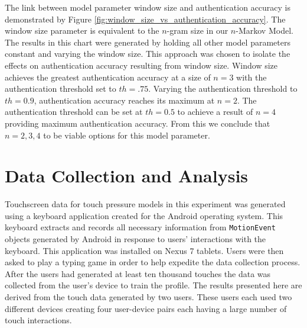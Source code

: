\documentclass{acm_proc_article-sp}
\begin{document}
The link between model parameter window size and authentication accuracy is demonstrated by Figure \ref{fig:window_size_vs_authentication_accuracy}.
The window size parameter is equivalent to the $n$-gram size in our $n$-Markov Model.
The results in this chart were generated by 
holding all other model parameters constant and varying the window size. 
This approach was chosen to isolate the effects on 
authentication accuracy resulting from window size.
Window size achieves the greatest authentication accuracy at a size of $n=3$ with the authentication threshold set to $th=.75$.
Varying the authentication threshold to $th=0.9$, authentication accuracy reaches its maximum at $n=2$. 
The authentication threshold can be set at $th=0.5$ to achieve a result of $n=4$ providing maximum authentication accuracy.
From this we conclude that $n={2,3,4}$ to be viable options for this model parameter.


\section{Data Collection and Analysis}
\label{sec:data_collection}
Touchscreen data for touch pressure models in this experiment 
was generated using a keyboard application created for the Android operating system. 
This keyboard extracts and records all necessary information 
from {\tt MotionEvent} objects generated by Android in response to
users' interactions with the keyboard.
This application was installed on Nexus 7 tablets.
Users were then asked to play a typing game 
in order to help expedite the data collection process.
After the users had generated at least ten thousand touches the data was collected from the user's device to train the profile.
%
The results presented here are derived from the touch data generated by two users.
These users each used two different devices creating four user-device pairs
each having a large number of touch interactions.

\end{document}
